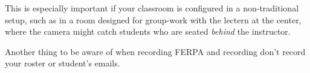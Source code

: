 \documentclass[sigconf]{acmart}
\begin{document}
This is especially important if your classroom is configured in a non-traditional setup, such as in a room designed for group-work with the lectern at the center, where the camera might catch students who are seated \textit{behind} the instructor.



Another thing to be aware of when recording 
FERPA and recording
don't record your roster or student's emails.





\end{document}
